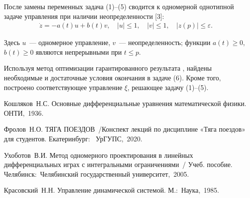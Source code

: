 После замены переменных задача (1)--(5) сводится к одномерной однотипной задаче управления при наличии неопределенности [3]:
\begin{eqnarray} \label{eq:Y1}
    \dot{z} = -a(t)u+b(t)v,  \quad |u|\leq1,\quad |v|\leq 1, \quad |z(p)|\leq \varepsilon.
\end{eqnarray}

Здесь $u$~--- одномерное управление, $v$~--- неопределенность; функции $a(t) \geq 0$,  $b(t) \geq 0$ являются непрерывными при $t \leq p$.

Используя метод оптимизации гарантированного результата \cite{Kras}, найдены необходимые и достаточные условия окончания в задаче (6). Кроме того, построено соответствующее управление $\xi$, решающее задачу (1)--(5).









\begin{thebibliography}{9} %
 Кошляков~Н.С. Основные дифференциальные уравнения математической физики. ОНТИ,~1936.

 Фролов~Н.О. ТЯГА ПОЕЗДОВ~/Конспект лекций
по дисциплине «Тяга поездов» для студентов. Екатеринбург:~ УрГУПС,~2020.

 Ухоботов~В.И. Метод одномерного проектирования в линейных дифференциальных играх с интегральными ограничениями~/ Учеб. пособие. Челябинск:~Челябинский государственный университет,~2005.

 Красовский~Н.Н. Управление динамической системой. М.:~Наука,~1985.


\end{thebibliography}





%


